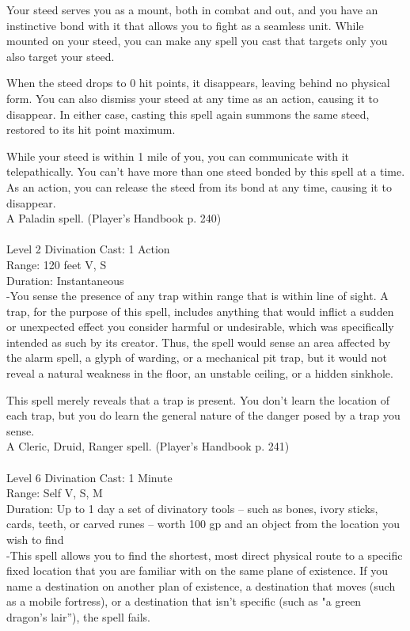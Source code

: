 \documentclass[10pt,twocolumn]{report}
\begin{document}
Your steed serves you as a mount, both in combat and out, and you have an instinctive bond with it that allows you to fight as a seamless unit. While mounted on your steed, you can make any spell you cast that targets only you also target your steed.

When the steed drops to 0 hit points, it disappears, leaving behind no physical form. You can also dismiss your steed at any time as an action, causing it to disappear. In either case, casting this spell again summons the same steed, restored to its hit point maximum.

While your steed is within 1 mile of you, you can communicate with it telepathically. You can’t have more than one steed bonded by this spell at a time. As an action, you can release the steed from its bond at any time, causing it to disappear.\\
A Paladin spell. (Player's Handbook p. 240) \\


 \\
Level 2 \quad Divination \quad Cast: 1 Action\\
Range: 120 feet \quad V, S\\
Duration: Instantaneous \quad \\
-You sense the presence of any trap within range that is within line of sight.
A trap, for the purpose of this spell, includes anything that would inflict a sudden or unexpected effect you consider harmful or undesirable, which was specifically intended as such by its creator. Thus, the spell would sense an area affected by the alarm spell, a glyph of warding, or a mechanical pit trap, but it would not reveal a natural weakness in the floor, an unstable ceiling, or a hidden sinkhole.

This spell merely reveals that a trap is present. You don’t learn the location of each trap, but you do learn the general nature of the danger posed by a trap you sense.\\
A Cleric, Druid, Ranger spell. (Player's Handbook p. 241) \\


 \\
Level 6 \quad Divination \quad Cast: 1 Minute\\
Range: Self \quad V, S, M\\
Duration: Up to 1 day \quad a set of divinatory tools – such as bones, ivory sticks, cards, teeth, or carved runes – worth 100 gp and an object from the location you wish to find\\
-This spell allows you to find the shortest, most direct physical route to a specific fixed location that you are familiar with on the same plane of existence. If you name a destination on another plan of existence, a destination that moves (such as a mobile fortress), or a destination that isn’t specific (such as "a green dragon’s lair”), the spell fails.
\end{document}
